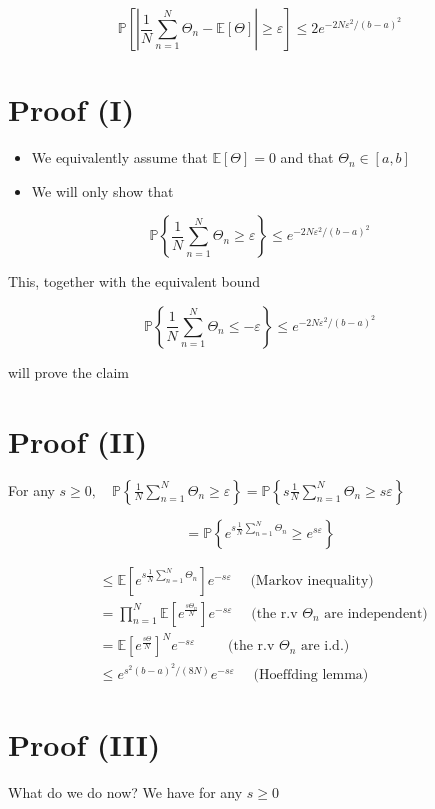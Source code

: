 \documentclass[10pt]{article}
\begin{document}
$$
\mathbb{P}\left[\left|\frac{1}{N} \sum_{n=1}^{N} \Theta_{n}-\mathbb{E}[\Theta]\right| \geq \varepsilon\right] \leq 2 e^{-2 N \varepsilon^{2} /(b-a)^{2}}
$$

\section*{Proof (I)}
\begin{itemize}
  \item We equivalently assume that $\mathbb{E}[\Theta]=0$ and that $\Theta_{n} \in[a, b]$
  \item We will only show that
\end{itemize}

$$
\mathbb{P}\left\{\frac{1}{N} \sum_{n=1}^{N} \Theta_{n} \geq \varepsilon\right\} \leq e^{-2 N \varepsilon^{2} /(b-a)^{2}}
$$

This, together with the equivalent bound

$$
\mathbb{P}\left\{\frac{1}{N} \sum_{n=1}^{N} \Theta_{n} \leq-\varepsilon\right\} \leq e^{-2 N \varepsilon^{2} /(b-a)^{2}}
$$

will prove the claim

\section*{Proof (II)}
For any $s \geq 0, \quad \mathbb{P}\left\{\frac{1}{N} \sum_{n=1}^{N} \Theta_{n} \geq \varepsilon\right\}=\mathbb{P}\left\{s \frac{1}{N} \sum_{n=1}^{N} \Theta_{n} \geq s \varepsilon\right\}$

$$
=\mathbb{P}\left\{e^{s \frac{1}{N} \sum_{n=1}^{N} \Theta_{n}} \geq e^{s \varepsilon}\right\}
$$

$$
\begin{aligned}
& \leq \mathbb{E}\left[e^{s \frac{1}{N} \sum_{n=1}^{N} \Theta_{n}}\right] e^{-s \varepsilon} \quad \text { (Markov inequality) } \\
& =\prod_{n=1}^{N} \mathbb{E}\left[e^{\frac{s \Theta_{n}}{N}}\right] e^{-s \varepsilon} \quad \text { (the r.v } \Theta_{n} \text { are independent) } \\
& =\mathbb{E}\left[e^{\frac{s \Theta}{N}}\right]^{N} e^{-s \varepsilon} \quad \quad \text { (the r.v } \Theta_{n} \text { are i.d.) } \\
& \leq e^{s^{2}(b-a)^{2} /(8 N)} e^{-s \varepsilon} \quad \text { (Hoeffding lemma) }
\end{aligned}
$$

\section*{Proof (III)}
What do we do now? We have for any $s \geq 0$
\end{document}
